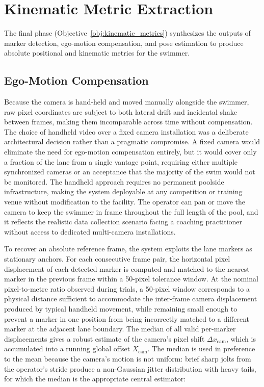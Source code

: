 \section{Kinematic Metric Extraction}\label{sec:kinematic-extraction}

The final phase (Objective~\ref{obj:kinematic_metrics}) synthesizes the outputs of marker detection, ego-motion compensation, and pose
estimation to produce absolute positional and kinematic metrics for the swimmer.

\subsection{Ego-Motion Compensation}

Because the camera is hand-held and moved manually alongside the swimmer, raw pixel coordinates
are subject to both lateral drift and incidental shake between frames, making them incomparable
across time without compensation. The choice of handheld video over a fixed camera installation
was a deliberate architectural decision rather than a pragmatic compromise. A fixed camera
would eliminate the need for ego-motion compensation entirely, but it would cover only a
fraction of the lane from a single vantage point, requiring either multiple synchronized
cameras or an acceptance that the majority of the swim would not be monitored. The handheld
approach requires no permanent poolside infrastructure, making the system deployable at any
competition or training venue without modification to the facility. The operator can pan or move the camera to keep the swimmer in frame throughout the full length of the pool, and it reflects the realistic
data collection scenario facing a coaching practitioner without access to dedicated multi-camera
installations.

To recover an absolute reference frame, the system exploits the lane markers as stationary
anchors. For each consecutive frame pair, the horizontal pixel displacement of each detected
marker is computed and matched to the nearest marker in the previous frame within a 50-pixel
tolerance window. At the nominal pixel-to-metre ratio observed during trials, a 50-pixel
window corresponds to a physical distance sufficient to accommodate the inter-frame camera
displacement produced by typical handheld movement, while remaining small enough to prevent a
marker in one position from being incorrectly matched to a different marker at the adjacent
lane boundary. The median of all valid per-marker displacements gives a robust estimate of the
camera's pixel shift $\Delta x_{\text{cam}}$, which is accumulated into a running global offset
$X_{\text{cam}}$. The median is used in preference to the mean because the camera's motion is
not uniform: brief sharp jolts from the operator's stride produce a non-Gaussian jitter
distribution with heavy tails, for which the median is the appropriate central estimator:

